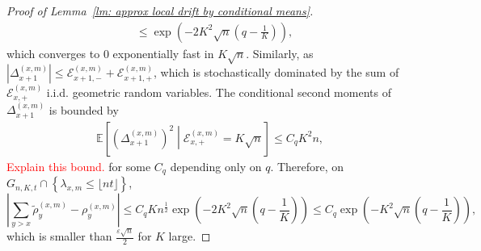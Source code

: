 \documentclass[twoside,12pt, a4paper]{article}
\numberwithin{equation}{section}
\theoremstyle{remark}
\newcommand{\abs}[1]{\left\vert #1 \right\vert}
\newcommand{\edt}[1]{\textcolor{red}{#1}} %
\begin{document}
\begin{proof}[Proof of Lemma~\ref{lm: approx local drift by conditional means}]
\begin{align*}
			&\le \exp\left( - 2 K^2 \sqrt{n}(q - \frac{1}{K})  \right) 
			,
		\end{align*}
		which converges to $0$ exponentially fast in $K \sqrt{n}$. Similarly, as $\abs{\Delta_{x+1}^{(x,m)}} \leq  \mathcal{E}_{x+1,-}^{(x,m)} + \mathcal{E}_{x+1,+}^{(x,m)}$, which is stochastically dominated by the sum of $ \mathcal{E}_{x,+}^{(x,m)}$ i.i.d. geometric random variables.
		The conditional second moments of $ \Delta_{x+1}^{(x,m)} $ is bounded by 
		\begin{align*}
			\mathbb{E}\left[ \left(\Delta_{x+1}^{(x,m)}\right)^2 \middle| \mathcal{E}_{x,+}^{(x,m)} = K \sqrt{n}  \right] \leq  C_q K^2 n,
		\end{align*}
		\edt{Explain this bound.}
		for some $C_q$ depending only on $q$.
		Therefore, on $G_{n,K,t} \cap \left\{ \lambda_{x,m} \leq\lfloor nt \rfloor \right\}$,
		\begin{equation}\label{eq: difference of cond means}
			\left| \sum_{y > x} \tilde\rho_y^{(x,m)} - \rho_y^{(x,m)} \right| \le C_q K n^{\frac{1}{2}} \exp\left( - 2K^2 \sqrt{n}(q - \frac{1}{K}) \right) \leq  C_q\exp\left( - K^2 \sqrt{n}(q - \frac{1}{K}) \right), 
		\end{equation}
		which is smaller than $\frac{\varepsilon \sqrt{n}}{2}$ for $K$ large.
		
		
	

\end{proof}
\end{document}
